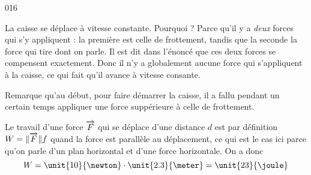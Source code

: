 

\begin{corrige}{016}

La caisse se déplace à vitesse constante. Pourquoi ? Parce qu'il y a \emph{deux} forces qui s'y appliquent : la première est celle de frottement, tandis que la seconde la force qui tire dont on parle. Il est dit dans l'énoncé que ces deux forces se compensent exactement. Donc il n'y a globalement aucune force qui s'appliquent à la caisse, ce qui fait qu'il avance à vitesse consante.

Remarque qu'au début, pour faire démarrer la caisse, il a fallu pendant un certain temps appliquer une force suppérieure à celle de frottement.

Le travail d'une force $\overrightarrow{F}$ qui se déplace d'une distance $d$ est par définition $W=\| \overrightarrow{F} \|f$ quand la force est parallèle au déplacement, ce qui est le cas ici parce qu'on parle d'un plan horizontal et d'une force horizontale. On a donc
\[ 
  W=\unit{10}{\newton}\cdot\unit{2.3}{\meter}=\unit{23}{\joule}
\]



\end{corrige}
